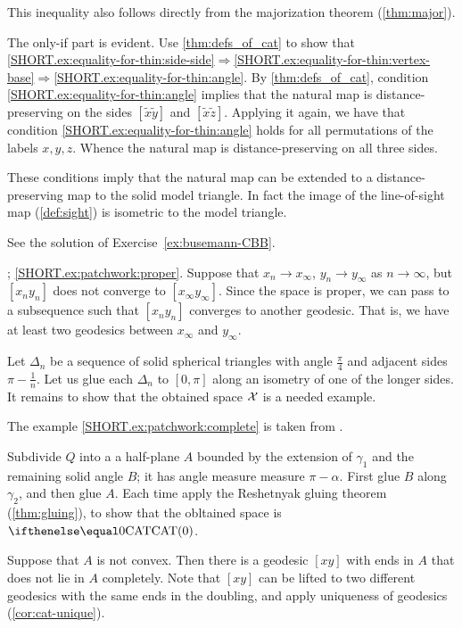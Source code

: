 This inequality also follows directly from the majorization theorem (\ref{thm:major}).

The only-if part is evident.
Use \ref{thm:defs_of_cat} to show that 
\ref{SHORT.ex:equality-for-thin:side-side}$\Rightarrow$\ref{SHORT.ex:equality-for-thin:vertex-base}$\Rightarrow$\ref{SHORT.ex:equality-for-thin:angle}.
By \ref{thm:defs_of_cat}, condition \ref{SHORT.ex:equality-for-thin:angle} implies that the natural map is distance-preserving on the sides $[\tilde x\tilde y]$ and $[\tilde x\tilde z]$.
Applying it again, we have that condition \ref{SHORT.ex:equality-for-thin:angle} holds for all permutations of the labels $x,y,z$.
Whence the natural map is distance-preserving on all three sides.

These conditions imply that the natural map can be extended to a distance-preserving map to the solid model triangle.
In fact the image of the line-of-sight map (\ref{def:sight}) is isometric to the model triangle.

See the solution of Exercise~\ref{ex:busemann-CBB}.

\parbf{\ref{ex:patchwork}}; \ref{SHORT.ex:patchwork:proper}.
Suppose that $x_n\to x_\infty$, $y_n\to y_\infty$ as $n\to\infty$,
but $[x_ny_n]$ does not converge to $[x_\infty y_\infty]$.
Since the space is proper, we can pass to a subsequence such that $[x_ny_n]$ converges to another geodesic.
That is, we have at least two geodesics between $x_\infty$ and $y_\infty$.

Let $\Delta_n$ be a sequence of solid spherical triangles 
with angle $\tfrac\pi4$ and adjacent sides $\pi-\tfrac1n$.
Let us glue each $\Delta_n$ to $[0,\pi]$ along an isometry of one of the longer sides.
It remains to show that the obtained space $\mathcal{X}$ is a needed example.

The example \ref{SHORT.ex:patchwork:complete} is taken from \cite[Chapter I, Exercise 3.14]{bridson-haefliger}.

Subdivide $Q$ into a a half-plane $A$ bounded by the extension of $\gamma_1$ and the remaining solid angle $B$; it has angle measure measure $\pi-\alpha$.
First glue $B$ along $\gamma_2$, and then glue $A$.
Each time apply the Reshetnyak gluing theorem (\ref{thm:gluing}), to show that the obltained space is $\CAT0$.

Suppose that $A$ is not convex.
Then there is a geodesic $[xy]$ with ends in $A$ that does not lie in $A$ completely.
Note that $[xy]$ can be lifted to two different geodesics with the same ends  in the doubling, and apply uniqueness of geodesics (\ref{cor:cat-unique}).

